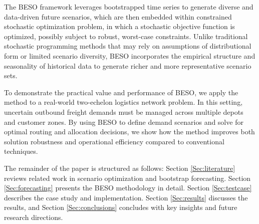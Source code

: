 \documentclass[ijoc,sglanonrev]{informs4}
\begin{document}
The BESO framework leverages bootstrapped time series to generate diverse and data-driven future scenarios, which are then embedded within constrained stochastic optimization problem, in which a stochastic objective function is optimized, possibly subject to robust, worst-case constraints. Unlike traditional stochastic programming methods that may rely on assumptions of distributional form or limited scenario diversity, BESO incorporates the empirical structure and seasonality of historical data to generate richer and more representative scenario sets.

To demonstrate the practical value and performance of BESO, we apply the method to a real-world two-echelon logistics network problem. In this setting, uncertain outbound freight demands must be managed across multiple depots and customer zones. By using BESO to define demand scenarios and solve for optimal routing and allocation decisions, we show how the method improves both solution robustness and operational efficiency compared to conventional techniques.

The remainder of the paper is structured as follows: Section \ref{Sec:literature} reviews related work in scenario optimization and bootstrap forecasting. Section \ref{Sec:forecasting} presents the BESO methodology in detail. Section \ref{Sec:testcase} describes the case study and implementation. Section \ref{Sec:results} discusses the results, and Section \ref{Sec:conclusions} concludes with key insights and future research directions.


\end{document}
